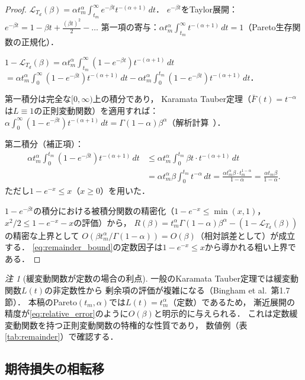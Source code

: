 \documentclass[12pt,a4paper]{article}
\theoremstyle{plain}
\theoremstyle{definition}
\theoremstyle{remark}
\newtheorem{remark}[theorem]{注}
\newcommand{\calL}{\mathcal{L}}
\begin{document}
\begin{proof}
$\calL_{T_d}(\beta)=\alpha t_m^\alpha\int_{t_m}^\infty e^{-\beta t}t^{-(\alpha+1)}\,dt$．
$e^{-\beta t}$をTaylor展開：$e^{-\beta t}=1-\beta t+\frac{(\beta t)^2}{2}-\ldots$
第一項の寄与：$\alpha t_m^\alpha\int_{t_m}^\infty t^{-(\alpha+1)}\,dt=1$（Pareto生存関数の正規化）．

$1-\calL_{T_d}(\beta)=\alpha t_m^\alpha\int_{t_m}^\infty(1-e^{-\beta t})t^{-(\alpha+1)}\,dt$
$=\alpha t_m^\alpha\int_0^\infty(1-e^{-\beta t})t^{-(\alpha+1)}\,dt
-\alpha t_m^\alpha\int_0^{t_m}(1-e^{-\beta t})t^{-(\alpha+1)}\,dt$．

第一積分は完全な$[0,\infty)$上の積分であり，
Karamata Tauber定理（$\bar F(t)=t^{-\alpha}$は$L\equiv1$の正則変動関数）を適用すれば：
$\alpha\int_0^\infty(1-e^{-\beta t})t^{-(\alpha+1)}\,dt=\Gamma(1-\alpha)\beta^\alpha$（解析計算~\cite{feller1971}）．

第二積分（補正項）：
\begin{align*}
\alpha t_m^\alpha\int_0^{t_m}(1-e^{-\beta t})t^{-(\alpha+1)}\,dt
&\le\alpha t_m^\alpha\int_0^{t_m}\beta t\cdot t^{-(\alpha+1)}\,dt\\
&=\alpha t_m^\alpha\beta\int_0^{t_m}t^{-\alpha}\,dt
=\frac{\alpha t_m^\alpha\beta\cdot t_m^{1-\alpha}}{1-\alpha}
=\frac{\alpha t_m\beta}{1-\alpha}.
\end{align*}
ただし$1-e^{-x}\le x$（$x\ge0$）を用いた．

$1-e^{-\beta t}$の積分における被積分関数の精密化（$1-e^{-x}\le\min(x,1)$，
$x^2/2\le1-e^{-x}-x$の評価）から，
$R(\beta)=t_m^\alpha\Gamma(1-\alpha)\beta^\alpha - (1-\calL_{T_d}(\beta))$の精密な上界として
$O(\beta t_m^\alpha/\Gamma(1-\alpha))=O(\beta)$（相対誤差として）が成立する．
\eqref{eq:remainder_bound}の定数因子は$1-e^{-x}\le x$から導かれる粗い上界である．
\end{proof}

\begin{remark}[緩変動関数が定数の場合の利点]
一般のKaramata Tauber定理では緩変動関数$L(t)$の非定数性から
剰余項の評価が複雑になる（Bingham et al.~\cite{bingham1989}第1.7節）．
本稿のPareto$(t_m,\alpha)$では$L(t)=t_m^\alpha$（定数）であるため，
漸近展開の精度が\eqref{eq:relative_error}のように$O(\beta)$と明示的に与えられる．
これは定数緩変動関数を持つ正則変動関数の特権的な性質であり，
数値例（表\ref{tab:remainder}）で確認する．
\end{remark}

\subsection{期待損失の相転移}
\end{document}
